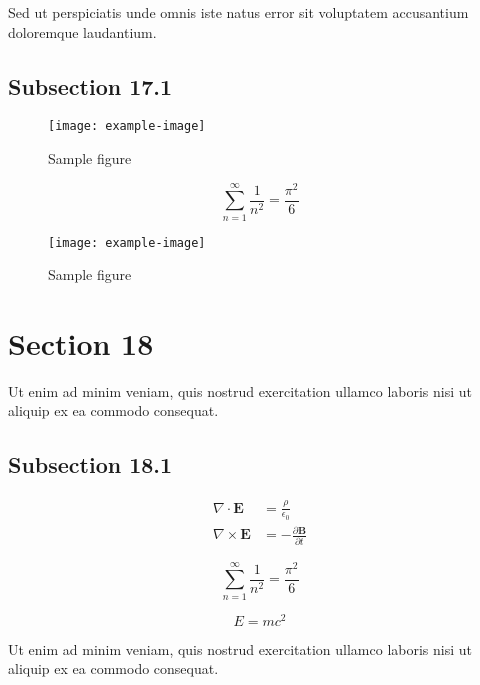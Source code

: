 \documentclass{article}
\begin{document}
Sed ut perspiciatis unde omnis iste natus error sit voluptatem accusantium doloremque laudantium.

\subsection{Subsection 17.1}


\begin{figure}[h]
    \centering
    \texttt{[image: example-image]}
    \caption{Sample figure}
    \label{fig:sample}
\end{figure}

\begin{equation}
    \sum_{n=1}^{\infty} \frac{1}{n^2} = \frac{\pi^2}{6}
\end{equation}

\begin{figure}[h]
    \centering
    \texttt{[image: example-image]}
    \caption{Sample figure}
    \label{fig:sample}
\end{figure}

\section{Section 18}

Ut enim ad minim veniam, quis nostrud exercitation ullamco laboris nisi ut aliquip ex ea commodo consequat.

\subsection{Subsection 18.1}

\begin{align}
    \nabla \cdot \mathbf{E} &= \frac{\rho}{\epsilon_0} \\
    \nabla \times \mathbf{E} &= -\frac{\partial \mathbf{B}}{\partial t}
\end{align}

\begin{equation}
    \sum_{n=1}^{\infty} \frac{1}{n^2} = \frac{\pi^2}{6}
\end{equation}

\begin{equation}
    E = mc^2
\end{equation}


Ut enim ad minim veniam, quis nostrud exercitation ullamco laboris nisi ut aliquip ex ea commodo consequat.
\end{document}
